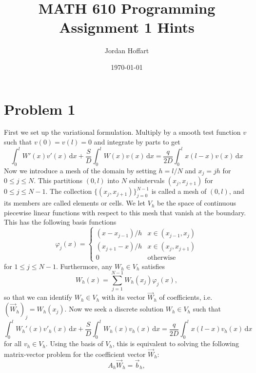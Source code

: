 \documentclass{article}
\title{MATH 610 Programming Assignment 1 Hints}
\author{Jordan Hoffart}
\date{\today}
\theoremstyle{definition}
\theoremstyle{plain}
\begin{document}
\maketitle

\section*{Problem 1}

First we set up the variational formulation.
Multiply by a smooth test function $v$ such that $v(0) = v(l) = 0$ and integrate by parts to get
\begin{equation}
  \int_0^lW'(x)v'(x)\,\mathrm dx + \frac{S}{D}\int_0^lW(x)v(x)\,\mathrm dx = \frac{q}{2D}\int_0^lx(l-x)v(x)\,\mathrm dx
\end{equation}
Now we introduce a mesh of the domain by setting $h = l/N$ and $x_j = jh$ for $0 \leq j \leq N$.
This partitions $(0,l)$ into $N$ subintervals $(x_j,x_{j+1})$ for $0 \leq j \leq N-1$.
The collection $\{(x_j,x_{j+1})\}_{j=0}^{N-1}$ is called a mesh of $(0,l)$, and its members are called elements or cells.
We let $V_h$ be the space of continuous piecewise linear functions with respect to this mesh that vanish at the boundary.
This has the following basis functions 
\begin{equation}
  \varphi_j(x) = \begin{cases} (x - x_{j-1})/h & x \in (x_{j-1},x_j) \\ (x_{j+1} - x)/h & x \in (x_j,x_{j+1}) \\ 0 & \text{otherwise} \end{cases}
\end{equation}
for $1 \leq j \leq N-1$.
Furthermore, any $W_h \in V_h$ satisfies
\begin{equation}
  W_h(x) = \sum_{j=1}^{N-1} W_h(x_j) \varphi_j(x),
\end{equation}
so that we can identify $W_h \in V_h$ with its vector $\vec W_h$ of coefficients, i.e. $(\vec W_h)_j = W_h(x_j)$.
Now we seek a discrete solution $W_h \in V_h$ such that 
\begin{equation}
  \int_0^lW_h'(x)v'_h(x)\,\mathrm dx + \frac{S}{D}\int_0^lW_h(x)v_h(x)\,\mathrm dx = \frac{q}{2D}\int_0^lx(l-x)v_h(x)\,\mathrm dx
\end{equation}
for all $v_h \in V_h$.
Using the basis of $V_h$, this is equivalent to solving the following matrix-vector problem for the coefficient vector $\vec W_h$:
\begin{equation}
  A_h\vec W_h = \vec b_h,
\end{equation}
\end{document}
